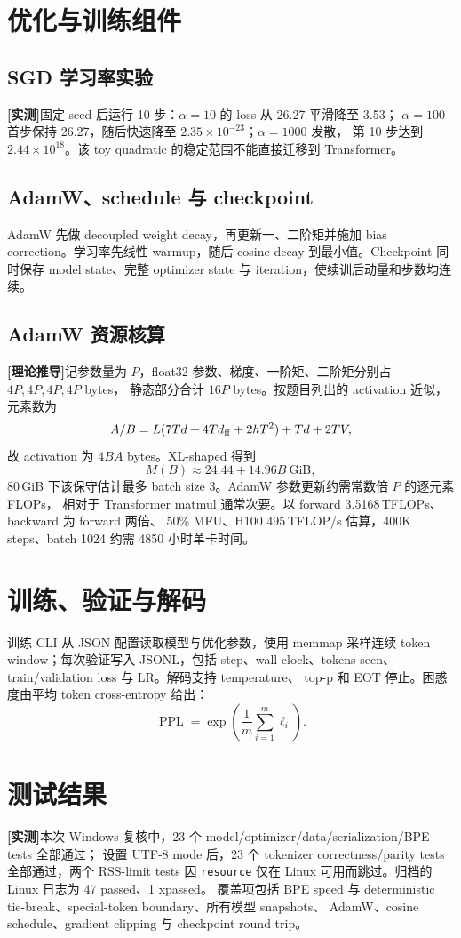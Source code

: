 \documentclass[UTF8,a4paper,11pt]{ctexart}
\newcommand{\measured}{\textbf{[实测]}}
\newcommand{\derived}{\textbf{[理论推导]}}
\begin{document}
\section{优化与训练组件}
\subsection{SGD 学习率实验}
\measured 固定 seed 后运行 10 步：$\alpha=10$ 的 loss 从 26.27 平滑降至 3.53；
$\alpha=100$ 首步保持 26.27，随后快速降至 $2.35\times10^{-23}$；$\alpha=1000$ 发散，
第 10 步达到 $2.44\times10^{18}$。该 toy quadratic 的稳定范围不能直接迁移到 Transformer。

\subsection{AdamW、schedule 与 checkpoint}
AdamW 先做 decoupled weight decay，再更新一、二阶矩并施加 bias correction。学习率先线性
warmup，随后 cosine decay 到最小值。Checkpoint 同时保存 model state、完整 optimizer state
与 iteration，使续训后动量和步数均连续。

\subsection{AdamW 资源核算}
\derived 记参数量为 $P$，float32 参数、梯度、一阶矩、二阶矩分别占 $4P,4P,4P,4P$ bytes，
静态部分合计 $16P$ bytes。按题目列出的 activation 近似，元素数为
\[
A/B=L(7Td+4Td_{\rm ff}+2hT^2)+Td+2TV,
\]
故 activation 为 $4BA$ bytes。XL-shaped 得到
\[
M(B)\approx 24.44+14.96B\ \text{GiB},
\]
80\,GiB 下该保守估计最多 batch size 3。AdamW 参数更新约需常数倍 $P$ 的逐元素 FLOPs，
相对于 Transformer matmul 通常次要。以 forward 3.5168\,TFLOPs、backward 为 forward 两倍、
50\% MFU、H100 495\,TFLOP/s 估算，400K steps、batch 1024 约需 4850 小时单卡时间。

\section{训练、验证与解码}
训练 CLI 从 JSON 配置读取模型与优化参数，使用 memmap 采样连续 token window；每次验证写入
JSONL，包括 step、wall-clock、tokens seen、train/validation loss 与 LR。解码支持 temperature、
top-p 和 EOT 停止。困惑度由平均 token cross-entropy 给出：
\[
\operatorname{PPL}=\exp\left(\frac1m\sum_{i=1}^m\ell_i\right).
\]

\section{测试结果}
\measured 本次 Windows 复核中，23 个 model/optimizer/data/serialization/BPE tests 全部通过；
设置 UTF-8 mode 后，23 个 tokenizer correctness/parity tests 全部通过，两个 RSS-limit tests
因 \texttt{resource} 仅在 Linux 可用而跳过。归档的 Linux 日志为 47 passed、1 xpassed。
覆盖项包括 BPE speed 与 deterministic tie-break、special-token boundary、所有模型 snapshots、
AdamW、cosine schedule、gradient clipping 与 checkpoint round trip。
\end{document}
